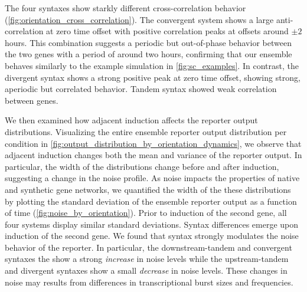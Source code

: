 \documentclass[11pt]{article}
\begin{document}
The four syntaxes show starkly different cross-correlation behavior (\cref{fig:orientation_cross_correlation}).  The convergent system shows a large anti-correlation at zero time offset with positive correlation peaks at offsets around \(\pm 2\) hours. This combination suggests a periodic but out-of-phase behavior between the two genes with a period of around two hours, confirming that our ensemble behaves similarly to the example simulation in \cref{fig:sc_examples}. In contrast, the divergent syntax shows a strong positive peak at zero time offset, showing strong, aperiodic but correlated behavior. Tandem syntax showed weak correlation between genes. 

We then examined how adjacent induction affects the reporter output distributions. Visualizing the entire ensemble reporter output distribution per condition in \cref{fig:output_distribution_by_orientation_dynamics}, we observe that adjacent induction changes both the mean and variance of the reporter output. In particular, the width of the distributions change before and after induction, suggesting a change in the noise profile.
As noise impacts the properties of native and synthetic gene networks, we quantified the width of the these distributions by plotting the standard deviation of the ensemble reporter output as a function of time (\cref{fig:noise_by_orientation}). Prior to induction of the second gene, all four systems display similar standard deviations. Syntax differences emerge upon induction of the second gene. We found that syntax strongly modulates the noise behavior of the reporter. In particular, the downstream-tandem and convergent syntaxes the show a strong \emph{increase} in noise levels while the upstream-tandem and divergent syntaxes show a small \emph{decrease} in noise levels. These changes in noise may results from differences in transcriptional burst sizes and frequencies.
\end{document}
